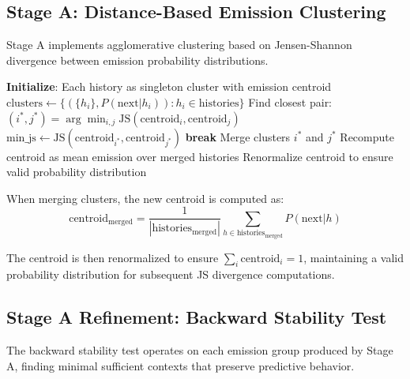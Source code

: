 \documentclass[11pt]{article}
\begin{document}
\subsection{Stage A: Distance-Based Emission Clustering}

Stage A implements agglomerative clustering based on Jensen-Shannon divergence between emission probability distributions.

\begin{codebox}
\begin{algorithmic}
\STATE \textbf{Initialize}: Each history as singleton cluster with emission centroid
\STATE $\text{clusters} \leftarrow \{(\{h_i\}, P(\text{next}|h_i)) : h_i \in \text{histories}\}$
    \STATE Find closest pair: $(i^*, j^*) = \arg\min_{i,j} \text{JS}(\text{centroid}_i, \text{centroid}_j)$
    \STATE $\text{min\_js} \leftarrow \text{JS}(\text{centroid}_{i^*}, \text{centroid}_{j^*})$
        \STATE \textbf{break} 
    \ENDIF
    \STATE Merge clusters $i^*$ and $j^*$
    \STATE Recompute centroid as mean emission over merged histories
    \STATE Renormalize centroid to ensure valid probability distribution
\ENDWHILE
\end{algorithmic}
\end{codebox}

\begin{notebox}
When merging clusters, the new centroid is computed as:
$$\text{centroid}_{\text{merged}} = \frac{1}{|\text{histories}_{\text{merged}}|} \sum_{h \in \text{histories}_{\text{merged}}} P(\text{next}|h)$$

The centroid is then renormalized to ensure $\sum_i \text{centroid}_i = 1$, maintaining a valid probability distribution for subsequent JS divergence computations.
\end{notebox}

\subsection{Stage A Refinement: Backward Stability Test}

The backward stability test operates on each emission group produced by Stage A, finding minimal sufficient contexts that preserve predictive behavior.
\end{document}
